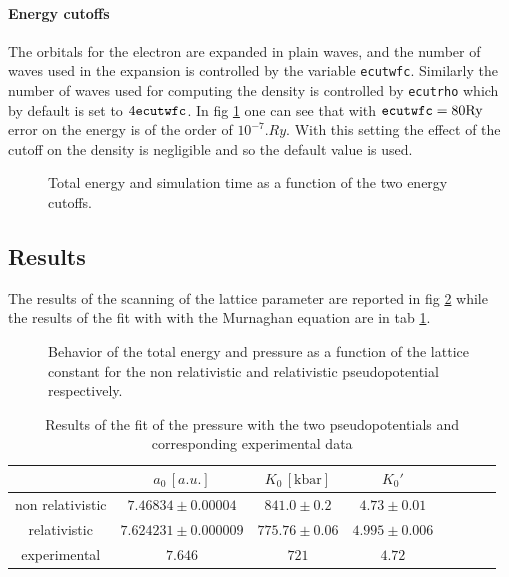 \documentclass[a4paper, 11pt]{article}
\begin{document}
  \paragraph{Energy cutoffs}
    The orbitals for the electron are expanded in plain waves, and the number of waves used in the expansion is controlled by the variable \verb|ecutwfc|. Similarly the number of waves used for computing the density is controlled by \verb|ecutrho| which by default is set to $4\verb|ecutwfc|$. In fig \ref{fig:bulk_ecut} one can see that with $ \verb|ecutwfc| = 80 \si{.Ry}$ error on the energy is of the order of $10^{-7} \si{.Ry}$. With this setting the effect of the cutoff on the density is negligible and so the default value is used.

    \begin{figure}
      \centering
      \caption{Total energy and simulation time as a function of the two energy cutoffs.}
      \label{fig:bulk_ecut}
    \end{figure}

  \subsection{Results}
    The results of the scanning of the lattice parameter are reported in fig \ref{fig:bulk_a} while the results of the fit with with the Murnaghan equation are in tab \ref{tab:bulk_a}.

  \begin{figure}
    \centering
    \caption{Behavior of the total energy and pressure as a function of the lattice constant for the non relativistic and relativistic pseudopotential respectively.}
    \label{fig:bulk_a}
  \end{figure}

  \begin{table}
    \centering
    \begin{tabular}{cccccccc}
      \toprule
        & $a_0\, [a.u.]$ & $K_0\, [\si{\kilo\bar}]$ & $K_0'$ \\
      \midrule
      non relativistic & $7.46834 \pm 0.00004$ & $841.0 \pm 0.2$ & $4.73 \pm 0.01$ \\
      relativistic & $7.624231 \pm 0.000009$ & $775.76 \pm 0.06$ & $4.995 \pm 0.006$ \\
      \midrule
      experimental \cite{rif:bulk_exp_data} & $7.646$ & $721$ & $4.72$ \\
      \bottomrule
    \end{tabular}
    \caption{Results of the fit of the pressure with the two pseudopotentials and corresponding experimental data}
    \label{tab:bulk_a}
  \end{table}
\end{document}
